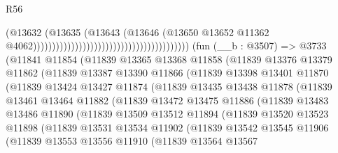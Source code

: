 \begin{lexlean}{R56}
\begin{coremodule}
                                                                            (@13632
                                                                              (@13635
                                                                                (@13643
                                                                                  (@13646
                                                                                    (@13650
                                                                                      @13652
                                                                                      @11362
                                                                                      @4062)))))))))))))))))))))))))))))))))))))))))
    (fun (__b : @3507) =>
    @3733
      (@11841
        @11854
        (@11839
          @13365
          @13368
          @11858
          (@11839
            @13376
            @13379
            @11862
            (@11839
              @13387
              @13390
              @11866
              (@11839
                @13398
                @13401
                @11870
                (@11839
                  @13424
                  @13427
                  @11874
                  (@11839
                    @13435
                    @13438
                    @11878
                    (@11839
                      @13461
                      @13464
                      @11882
                      (@11839
                        @13472
                        @13475
                        @11886
                        (@11839
                          @13483
                          @13486
                          @11890
                          (@11839
                            @13509
                            @13512
                            @11894
                            (@11839
                              @13520
                              @13523
                              @11898
                              (@11839
                                @13531
                                @13534
                                @11902
                                (@11839
                                  @13542
                                  @13545
                                  @11906
                                  (@11839
                                    @13553
                                    @13556
                                    @11910
                                    (@11839
                                      @13564
                                      @13567

\end{coremodule}
\end{lexlean}

